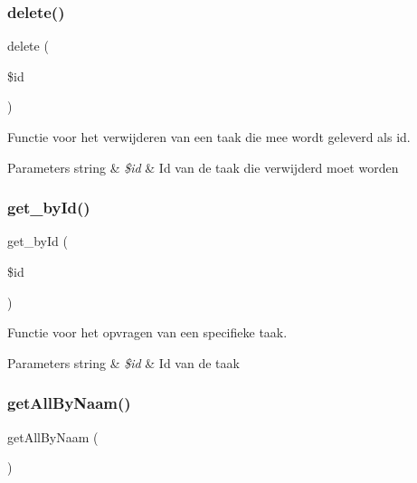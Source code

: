 \subsubsection{\texorpdfstring{delete()}{delete()}}
{\footnotesize\ttfamily delete (\begin{DoxyParamCaption}\item[{}]{\$id }\end{DoxyParamCaption})}



Functie voor het verwijderen van een taak die mee wordt geleverd als id. 


\begin{DoxyParams}[1]{Parameters}
string & {\em \$id} & Id van de taak die verwijderd moet worden \\
\hline
\end{DoxyParams}
\mbox{\label{class_taken___model_a98d28a4d9a29d40c5a8aa0176f19a919}} 
\subsubsection{\texorpdfstring{get\+\_\+by\+Id()}{get\_byId()}}
{\footnotesize\ttfamily get\+\_\+by\+Id (\begin{DoxyParamCaption}\item[{}]{\$id }\end{DoxyParamCaption})}



Functie voor het opvragen van een specifieke taak. 


\begin{DoxyParams}[1]{Parameters}
string & {\em \$id} & Id van de taak \\
\hline
\end{DoxyParams}
\mbox{\label{class_taken___model_a2b035b1ffd1cbe651b35bb3e53d72c09}} 
\subsubsection{\texorpdfstring{get\+All\+By\+Naam()}{getAllByNaam()}}
{\footnotesize\ttfamily get\+All\+By\+Naam (\begin{DoxyParamCaption}{ }\end{DoxyParamCaption})}



